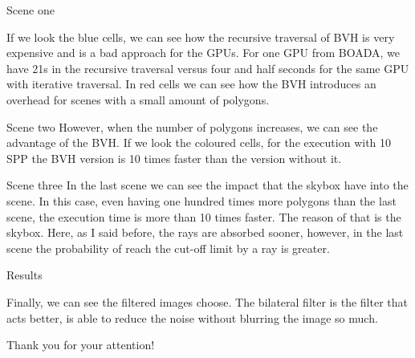 \documentclass{beamer}
\begin{document}
\begin{frame}{Scene one}

If we look the blue cells, we can see how the recursive traversal of BVH is very expensive and is a bad approach for the GPUs. For one GPU from BOADA, we have 21s in the recursive traversal versus four and half seconds for the same GPU with iterative traversal.
In red cells we can see how the BVH introduces an overhead for scenes with a small amount of polygons. 


\end{frame}

\begin{frame}{Scene two}
However, when the number of polygons increases, we can see the advantage of the BVH. If we look the coloured cells, for the execution with 10 SPP the BVH version is 10 times faster than the version without it.
\end{frame}

\begin{frame}{Scene three}
In the last scene we can see the impact that the skybox have into the scene. In this case, even having one hundred times more polygons than the last scene, the execution time is more than 10 times faster. The reason of that is the skybox. Here, as I said before, the rays are absorbed sooner, however, in the last scene the probability of reach the cut-off limit by a ray is greater.

\end{frame}


\begin{frame}{Results}

Finally, we can see the filtered images choose. The bilateral filter is the filter that acts better, is able to reduce the noise without blurring the image so much.

\end{frame}


\begin{frame}%
\begin{center}
{\fontsize{40}{50}\selectfont Thank you for your attention!}
\end{center}
\end{frame}
\end{document}
